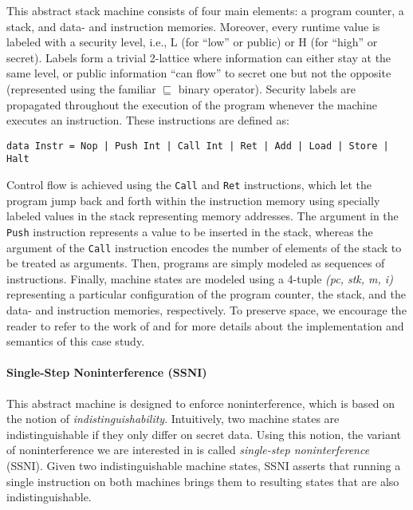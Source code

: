 \documentclass[sigconf, anonymous, review]{acmart}
\begin{document}
This abstract stack machine consists of four main elements: a program counter, a
stack, and data- and instruction memories.
%
Moreover, every runtime value is labeled with a security level, i.e., L (for
``low'' or public) or H (for ``high'' or secret).
%
Labels form a trivial 2-lattice where information can either stay at the same
level, or public information ``can flow'' to secret one but not the opposite
(represented using the familiar $\sqsubseteq$ binary operator).
%
Security labels are propagated throughout the execution of the program whenever
the machine executes an instruction.
%
These instructions are defined as:
%
\begin{verbatim}
data Instr = Nop | Push Int | Call Int | Ret | Add | Load | Store | Halt
\end{verbatim}

\noindent Control flow is achieved using the \texttt{Call} and \texttt{Ret}
instructions, which let the program jump back and forth within the instruction
memory using specially labeled values in the stack representing memory
addresses.
%
The argument in the \texttt{Push} instruction represents a value to be
inserted in the stack, whereas the argument of the \texttt{Call} instruction
encodes the number of elements of the stack to be treated as arguments.
%
Then, programs are simply modeled as sequences of instructions.
%
Finally, machine states are modeled using a 4-tuple \textit{(pc, stk, m, i)}
representing a particular configuration of the program counter, the stack, and
the data- and instruction memories, respectively.
%
To preserve space, we encourage the reader to refer to the work of
\citeauthor{hritcu2013testing} \citeyearpar{hritcu2013testing,
  hrictcu2016testing} and \citeauthor{lampropoulos2019coverage} for more details
about the implementation and semantics of this case study.

\paragraph{Single-Step Noninterference (SSNI)}

This abstract machine is designed to enforce noninterference, which is based on
the notion of \emph{indistinguishability}.
%
Intuitively, two machine states are indistinguishable if they only differ on
secret data.
%
Using this notion, the variant of noninterference we are interested in is called
\emph{single-step noninterference} \cite{hritcu2013testing} (SSNI).
%
Given two indistinguishable machine states, SSNI asserts that running a single
instruction on both machines brings them to resulting states that are also
indistinguishable.
\end{document}

